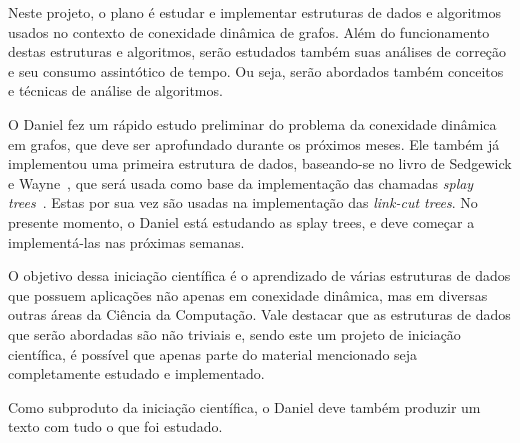 Neste projeto, o plano é estudar e implementar estruturas de dados e algoritmos
usados no contexto de conexidade dinâmica de grafos.  Além do funcionamento destas 
estruturas e algoritmos, serão estudados também suas análises de correção e seu 
consumo assintótico de tempo.  Ou seja, serão abordados também conceitos e técnicas
de análise de algoritmos. 

O Daniel fez um rápido estudo preliminar do problema da conexidade dinâmica em grafos, 
que deve ser aprofundado durante os próximos meses. Ele também já implementou uma 
primeira estrutura de dados, baseando-se no livro de Sedgewick e Wayne~\cite{SedgewickW2011},
que será usada como base da implementação das chamadas \emph{splay trees}~\cite{SleatorT1985}. 
Estas por sua vez são usadas na implementação das \emph{link-cut trees}. 
No presente momento, o Daniel está estudando as splay trees, 
e deve começar a implementá-las nas próximas semanas. 

O objetivo dessa iniciação científica é o aprendizado de várias estruturas de dados 
que possuem aplicações não apenas em conexidade dinâmica, mas em diversas outras 
áreas da Ciência da Computação.  Vale destacar que as estruturas de dados que serão 
abordadas são não triviais e, sendo este um projeto de iniciação científica, é 
possível que apenas parte do material mencionado seja completamente estudado e
implementado. 

Como subproduto da iniciação científica, o Daniel deve também produzir
um texto com tudo o que foi estudado. 